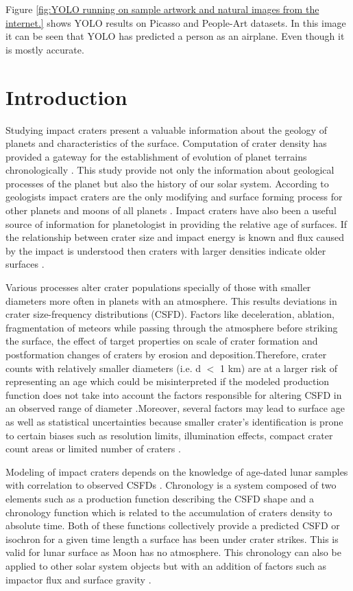 \documentclass[11pt]{article}
\begin{document}
Figure \ref{fig:YOLO running on sample artwork and natural images from the internet.} shows YOLO results on Picasso and People-Art datasets. In this image it can be seen that YOLO has predicted a person as an airplane. Even though it is mostly accurate.
\fi

\section{Introduction}
Studying impact craters present a valuable information about the geology of planets and characteristics of the surface. Computation of crater density has provided a gateway for the establishment of evolution of planet terrains chronologically \cite{martins2009crater}. This study provide not only the information about geological processes of the planet but also the history of our solar system. According to geologists impact craters are the only modifying and surface forming process for other planets and moons of all planets \cite{koeberl1994african}. Impact craters have also been a useful source of information for planetologist in providing the relative age of surfaces. If the relationship between crater size and impact energy is known and flux caused by the impact is understood then craters with larger densities indicate older surfaces \cite{ivanov2002comparison}.

Various processes alter crater populations specially of those with smaller diameters \cite{opik1965mariner} more often in planets with an atmosphere. This results deviations in crater size-frequency distributions (CSFD). Factors like deceleration, ablation, fragmentation of meteors while passing through the atmosphere before striking the surface, the effect of target properties on scale of crater formation and postformation changes of craters by erosion and deposition.Therefore, crater counts with relatively smaller diameters (i.e. d $<$ 1 km) are at a larger risk of representing an age which could be misinterpreted if the modeled production function does not take into account the factors responsible for altering CSFD in an observed range of diameter \cite{hartmann1981chronology}.Moreover, several factors may lead to surface age as well as statistical uncertainties because smaller crater's identification is prone to certain biases such as resolution limits, illumination effects, compact crater count areas or limited number of craters \cite{soderblom1970distribution}.

Modeling of impact craters depends on the knowledge of age-dated lunar samples with correlation to observed CSFDs \cite{williams2018dating}. Chronology is a system composed of two elements such as a production function describing the CSFD shape and a chronology function which is related to the accumulation of craters density to absolute time. Both of these functions collectively provide a predicted CSFD or isochron for a given time length a surface has been under crater strikes. This is valid for lunar surface as Moon has no atmosphere. This chronology can also be applied to other solar system objects but with an addition of factors such as impactor flux and surface gravity \cite{ivanov2002comparison}.
\end{document}
